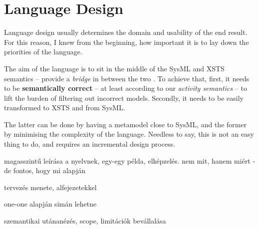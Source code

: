 \section{Language Design}

Language design usually determines the domain and usability of the end result. For this reason, I knew from the beginning, how important it is to lay down the priorities of the language.

The aim of the language is to sit in the middle of the SysML and XSTS semantics -- provide a \emph{bridge} in between the two .
To achieve that, first, it needs to be \textbf{semantically correct} -- at least according to our \emph{activity semantics} -- to lift the burden of filtering out incorrect models. Secondly, it needs to be easily transformed to XSTS and from SysML.

The latter can be done by having a metamodel close to SysML, and the former by minimising the complexity of the language. Needless to say, this is not an easy thing to do, and requires an incremental design process.


magasszintű leírása a nyelvnek, egy-egy példa, elképzelés.
nem mit, hanem miért - de fontos, hogy mi alapján

tervezés menete, alfejezetekkel

one-one alapján simán lehetne

szemantikai utánanézés, scope, limitációk bevállalása